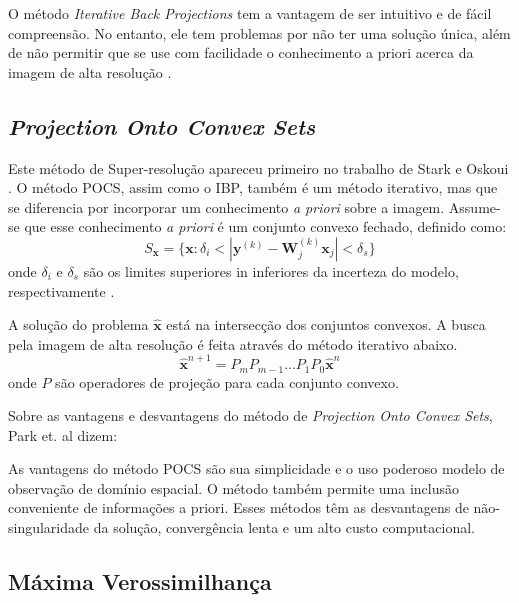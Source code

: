 O método \emph{Iterative Back Projections} tem a vantagem de ser intuitivo e de fácil compreensão.
No entanto, ele tem problemas por não ter uma solução única, além de não permitir que se use com facilidade o conhecimento a priori acerca da imagem de alta resolução \cite{nasrollahi2014super, park2003super}.

\subsection{\emph{Projection Onto Convex Sets}}
Este método de Super-resolução apareceu primeiro no trabalho de Stark e Oskoui \cite{stark1989high}.
O método POCS, assim como o IBP, também é um método iterativo, mas que se diferencia por incorporar um conhecimento \emph{a priori} sobre a imagem. Assume-se que esse conhecimento \emph{a priori} é um conjunto convexo fechado, definido como:
\begin{equation}
	S_{\mathbf{x}} = \{ \mathbf{x} : \delta_i < |\mathbf{y}^{(k)}-\mathbf{W}^{(k)}_j \mathbf{x}_j| < \delta_s \}
\end{equation}
onde $\delta_i$ e $\delta_s$ são os limites superiores in inferiores da incerteza do modelo, respectivamente \cite{nasrollahi2014super}.

A solução do problema $\hat{\mathbf{x}}$ está na intersecção dos conjuntos convexos. A busca pela imagem de alta resolução é feita através do método iterativo abaixo\cite{reis2014metodo}.
\begin{equation}
	\hat{\mathbf{x}}^{n+1} = P_m P_{m-1} ... P_1 P_0 \hat{\mathbf{x}}^{n}
\end{equation}
onde $P$ são operadores de projeção para cada conjunto convexo.

Sobre as vantagens e desvantagens do método de \emph{Projection Onto Convex Sets}, Park et. al dizem:

\begin{citacao}
As vantagens do método POCS são sua simplicidade e o uso poderoso modelo de observação de domínio espacial. O método também permite uma inclusão conveniente de informações a priori. Esses métodos têm as desvantagens de não-singularidade da solução, convergência lenta e um alto custo computacional. \cite{park2003super}
\end{citacao}


\subsection{Máxima Verossimilhança}
\label{sec:metodosprob}

